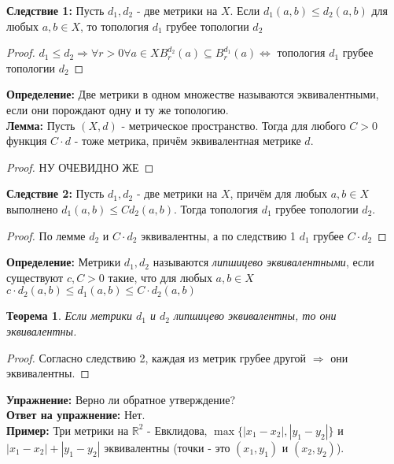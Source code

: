 \documentclass[a4paper,100pt]{article}
\theoremstyle{indented}
\newtheorem{theorem}{Теорема}
\begin{document}
\textbf{Следствие 1:} Пусть $d_1, d_2$ - две метрики на $X$. Если $d_1(a, b) \leq d_2(a, b)$ для любых $a, b \in X$, то топология $d_1$ грубее топологии $d_2$

\begin{proof} $d_1 \leq d_2 \Rightarrow \forall r > 0 \forall a \in X B_r^{d_2}(a) \subseteq B_r^{d_1}(a) \Longleftrightarrow$ топология $d_1$ грубее топологии $d_2$
\end{proof}

\textbf{Определение:} Две метрики в одном множестве называются \hypertarget{n13}{эквивалентными}, если они порождают одну и ту же топологию.
\\

\textbf{Лемма: } Пусть $(X, d)$ - метрическое пространство. Тогда для любого $C>0$ функция $C \cdot d$ - тоже метрика, причём эквивалентная метрике $d$.

\begin{proof} НУ ОЧЕВИДНО ЖЕ
\end{proof}

\textbf{Следствие 2:} Пусть $d_1, d_2$ - две метрики на $X$, причём для любых $a, b \in X$ выполнено $d_1(a, b) \leq Cd_2(a, b)$. Тогда топология $d_1$ грубее топологии $d_2$.

\begin{proof} По лемме $d_2$ и $C \cdot d_2$ эквивалентны, а по следствию 1 $d_1$ грубее $C \cdot d_2$
\end{proof}

\textbf{Определение: } Метрики $d_1, d_2$ \hypertarget{n14}{называются} \textit{липшицево эквивалентными}, если существуют $c, C > 0$ такие, что для любых $a, b \in X$ $c \cdot d_2(a, b) \leq d_1(a, b) \leq C \cdot d_2(a, b)$
\\
\begin{theorem}
Если метрики $d_1$ и $d_2$ липшицево эквивалентны, то они эквивалентны.
\end{theorem}

\begin{proof} Согласно следствию 2, каждая из метрик грубее другой $\Rightarrow$ они эквивалентны.
\end{proof}
 
\textbf{Упражнение:} Верно ли обратное утверждение?
\\

\textbf{Ответ на упражнение:} Нет.
\\

\textbf{Пример: } Три метрики на $\mathbb{R}^2$ - Евклидова, $\max\{|x_1-x_2|, |y_1-y_2|\}$ и $|x_1-x_2|+|y_1-y_2|$ эквивалентны (точки - это $(x_1, y_1)$ и $(x_2, y_2)$).
\end{document}

